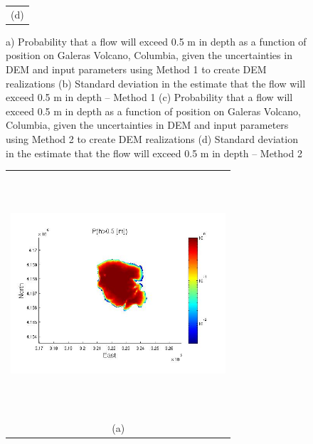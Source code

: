\documentclass[12pt]{article}
\newcommand{\Pic}[2][0.85]{\begin{center}\texttt{[image: \#2]}
 \end{center} }
\begin{document}
\begin{figure}[H]
\begin{minipage}{0.6\textwidth}
\begin{tabular}{c}
        (d)
        \end{tabular}
    \end{minipage} 
\caption{a) Probability that a flow will exceed 0.5 m in depth as a function of position on Galeras Volcano, Columbia, given the uncertainties in DEM and input parameters using  Method 1 to create DEM realizations (b) Standard deviation in the estimate that the flow will exceed 0.5 m in depth -- Method 1
(c) Probability that a flow will exceed 0.5 m in depth as a function of position on Galeras Volcano, Columbia, given the uncertainties in DEM and input parameters using Method 2 to create DEM realizations (d) Standard deviation in the estimate that the flow will exceed 0.5 m in depth -- Method 2}
\label{fig3}  
\end{figure}

\begin{figure}[H]
    \begin{minipage}[b]{0.6\textwidth}
        \begin{tabular}{c}
       \includegraphics[width=8cm,height=9cm,keepaspectratio]{figs/Mammoth_0_P_5m.jpg}\\
        (a)
        \end{tabular}
    \end{minipage}
    \begin{minipage}{0.6\textwidth}
        \begin{tabular}{c}

\end{tabular}
\end{minipage}
\end{figure}
\end{document}
